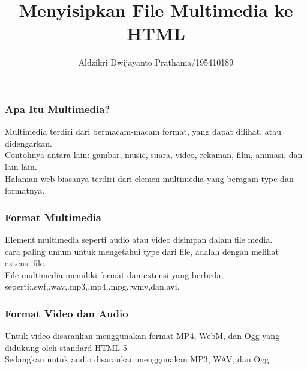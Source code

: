 \documentclass{beamer}
\title{Menyisipkan File Multimedia ke HTML}
\author{Aldzikri Dwijayanto Prathama/195410189}
\begin{document}
\maketitle

\begin{frame}
    \frametitle{Apa Itu Multimedia?}
    Multimedia terdiri dari bermacam-macam format, yang dapat dilihat, atau didengarkan.\\
    Contohnya antara lain: gambar, music, suara, video, rekaman, film, animasi, dan lain-lain.\\
    Halaman web biasanya terdiri dari elemen multimedia yang beragam type dan formatnya.\\
\end{frame}

\begin{frame}
    \frametitle{Format Multimedia}
    Element multimedia seperti audio atau video disimpan dalam file media.\\
    cara paling umum untuk mengetahui type dari file, adalah dengan melihat extensi file.\\
    File multimedia memiliki format dan extensi yang berbeda, seperti:.swf,.wav,.mp3,.mp4,.mpg,.wmv,dan.avi.
\end{frame}

\begin{frame}
    \frametitle{Format Video dan Audio}
    Untuk video disarankan menggunakan format MP4, WebM, dan Ogg yang didukung oleh standard HTML 5\\
    Sedangkan untuk audio disarankan menggunakan MP3, WAV, dan Ogg.
\end{frame}

\end{document}
